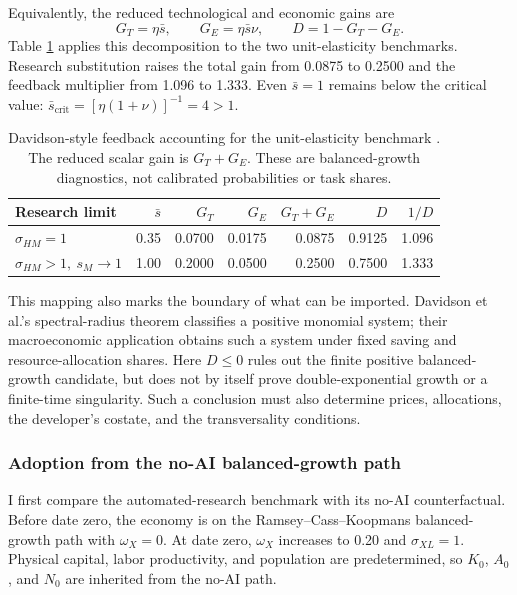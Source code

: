 Equivalently, the reduced technological and economic gains are
\[
 G_T=\eta\bar s,\qquad
 G_E=\eta\bar s\nu,\qquad
 D=1-G_T-G_E.
\]
Table \ref{tab:axm-feedback-accounting} applies this decomposition to the two
unit-elasticity benchmarks. Research substitution raises the total gain from
0.0875 to 0.2500 and the feedback multiplier from 1.096 to 1.333. Even
\(\bar s=1\) remains below the critical value:
\(\bar s_{\mathrm{crit}}=[\eta(1+\nu)]^{-1}=4>1\).

\begin{table}[H]
\centering
\small
\begin{tabular}{lrrrrrr}
\toprule
Research limit & \(\bar s\) & \(G_T\) & \(G_E\) & \(G_T+G_E\) & \(D\) & \(1/D\)\\
\midrule
\(\sigma_{HM}=1\) & 0.35 & 0.0700 & 0.0175 & 0.0875 & 0.9125 & 1.096\\
\(\sigma_{HM}>1,\ s_M\to1\) & 1.00 & 0.2000 & 0.0500 & 0.2500 & 0.7500 & 1.333\\
\bottomrule
\end{tabular}
\caption{Davidson-style feedback accounting for the unit-elasticity benchmark
\citep{davidsonetal2026}. The reduced scalar gain is \(G_T+G_E\).
These are balanced-growth diagnostics, not calibrated probabilities or task
shares.}
\label{tab:axm-feedback-accounting}
\end{table}

This mapping also marks the boundary of what can be imported. Davidson et al.'s
spectral-radius theorem classifies a positive monomial system; their macroeconomic
application obtains such a system under fixed saving and resource-allocation
shares. Here \(D\leq0\) rules out the finite positive
balanced-growth candidate, but does not by itself prove double-exponential growth
or a finite-time singularity. Such a conclusion must also determine prices,
allocations, the developer's costate, and the transversality conditions.

\subsubsection{Adoption from the no-AI balanced-growth path}
\label{sec:axm-ai-adoption-experiment}

I first compare the automated-research benchmark with its no-AI counterfactual.
Before date zero, the economy is on the Ramsey--Cass--Koopmans balanced-growth
path with \(\omega_X=0\). At date zero, \(\omega_X\) increases to 0.20 and
\(\sigma_{XL}=1\). Physical capital, labor productivity, and population are
predetermined, so \(K_0\), \(A_0\), and \(N_0\) are inherited from the no-AI
path.

